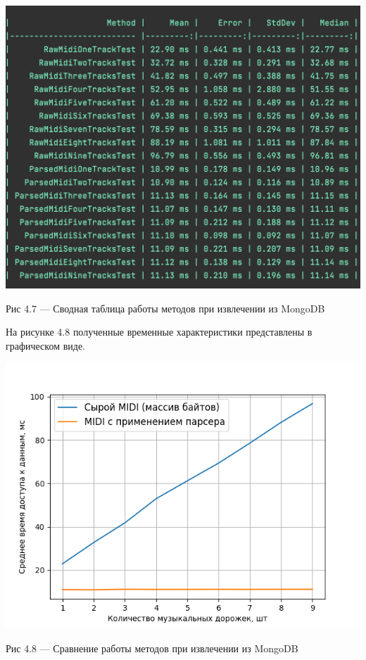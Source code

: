 \begin{center}
		\includegraphics[scale=0.6]{tex/img/FindClean.png}
		
			Рис 4.7 — Сводная таблица работы методов при извлечении из MongoDB
\end{center}

На рисунке 4.8 полученные временные характеристики представлены в графическом виде.

\begin{center}
		\includegraphics[scale=0.7]{tex/img/figure_find_query.png}
		
			Рис 4.8 — Сравнение работы методов при извлечении из MongoDB
\end{center}

